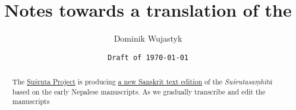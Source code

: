 \documentclass[12pt]{article}
\title{Notes towards a translation of the \SS}
\author{Dominik Wujastyk}
\date{\texttt{Draft of \today }}
\begin{document}
       
    
    \maketitle
    
    \begin{abstract}
        The \href{http://sushrutaproject.org}{Suśruta Project} is producing 
        \href{https://saktumiva.org/wiki/wujastyk/susrutasamhita/01-su.su/provisional-edition_sutrasthana}{a
         new Sanskrit text edition} of the 
        \emph{Suśrutasaṃhitā} based on the early Nepalese manuscripts.  As we gradually transcribe 
        and edit the manuscripts
        
        \end{abstract}
    
\end{document}
